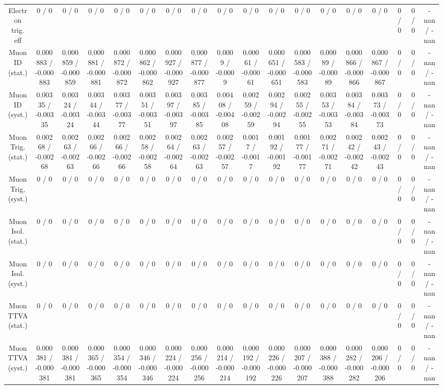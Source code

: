 \documentclass[10pt]{article}
\begin{document}
\begin{table}[htbp]
\begin{center}
\begin{tabular}{|c|c|c|c|c|c|c|c|c|c|c|c|c|c|c|c|c|c|}
  Electron trig. eff & 0 / 0 & 0 / 0 & 0 / 0 & 0 / 0 & 0 / 0 & 0 / 0 & 0 / 0 & 0 / 0 & 0 / 0 & 0 / 0 & 0 / 0 & 0 / 0 & 0 / 0 & 0 / 0 & 0 / 0 & 0 / 0 & -nan / -nan \\ 
  Muon ID (stat.) & 0.000883 / -0.000883 & 0.000859 / -0.000859 & 0.000881 / -0.000881 & 0.000872 / -0.000872 & 0.000862 / -0.000862 & 0.000927 / -0.000927 & 0.000877 / -0.000877 & 0.0009 / -0.0009 & 0.00061 / -0.00061 & 0.000651 / -0.000651 & 0.000583 / -0.000583 & 0.00089 / -0.00089 & 0.000866 / -0.000866 & 0.000867 / -0.000867 & 0 / 0 & 0 / 0 & -nan / -nan \\ 
  Muon ID (syst.) & 0.00335 / -0.00335 & 0.00324 / -0.00324 & 0.00344 / -0.00344 & 0.00377 / -0.00377 & 0.00351 / -0.00351 & 0.00397 / -0.00397 & 0.00385 / -0.00385 & 0.00408 / -0.00408 & 0.00259 / -0.00259 & 0.00294 / -0.00294 & 0.00255 / -0.00255 & 0.00353 / -0.00353 & 0.00384 / -0.00384 & 0.00373 / -0.00373 & 0 / 0 & 0 / 0 & -nan / -nan \\ 
  Muon Trig. (stat.) & 0.00268 / -0.00268 & 0.00263 / -0.00263 & 0.00266 / -0.00266 & 0.00266 / -0.00266 & 0.00258 / -0.00258 & 0.00264 / -0.00264 & 0.00263 / -0.00263 & 0.00257 / -0.00257 & 0.0017 / -0.0017 & 0.00192 / -0.00192 & 0.00177 / -0.00177 & 0.00271 / -0.00271 & 0.00242 / -0.00242 & 0.00243 / -0.00243 & 0 / 0 & 0 / 0 & -nan / -nan \\ 
  Muon Trig. (syst.) & 0 / 0 & 0 / 0 & 0 / 0 & 0 / 0 & 0 / 0 & 0 / 0 & 0 / 0 & 0 / 0 & 0 / 0 & 0 / 0 & 0 / 0 & 0 / 0 & 0 / 0 & 0 / 0 & 0 / 0 & 0 / 0 & -nan / -nan \\ 
  Muon Isol. (stat.) & 0 / 0 & 0 / 0 & 0 / 0 & 0 / 0 & 0 / 0 & 0 / 0 & 0 / 0 & 0 / 0 & 0 / 0 & 0 / 0 & 0 / 0 & 0 / 0 & 0 / 0 & 0 / 0 & 0 / 0 & 0 / 0 & -nan / -nan \\ 
  Muon Isol. (syst.) & 0 / 0 & 0 / 0 & 0 / 0 & 0 / 0 & 0 / 0 & 0 / 0 & 0 / 0 & 0 / 0 & 0 / 0 & 0 / 0 & 0 / 0 & 0 / 0 & 0 / 0 & 0 / 0 & 0 / 0 & 0 / 0 & -nan / -nan \\ 
  Muon TTVA (stat.) & 0 / 0 & 0 / 0 & 0 / 0 & 0 / 0 & 0 / 0 & 0 / 0 & 0 / 0 & 0 / 0 & 0 / 0 & 0 / 0 & 0 / 0 & 0 / 0 & 0 / 0 & 0 / 0 & 0 / 0 & 0 / 0 & -nan / -nan \\ 
  Muon TTVA (syst.) & 0.000381 / -0.000381 & 0.000381 / -0.000381 & 0.000365 / -0.000365 & 0.000354 / -0.000354 & 0.000346 / -0.000346 & 0.000224 / -0.000224 & 0.000256 / -0.000256 & 0.000214 / -0.000214 & 0.000192 / -0.000192 & 0.000226 / -0.000226 & 0.000207 / -0.000207 & 0.000388 / -0.000388 & 0.000282 / -0.000282 & 0.000206 / -0.000206 & 0 / 0 & 0 / 0 & -nan / -nan \\ 

\end{tabular}
\end{center}
\end{table}
\end{document}
